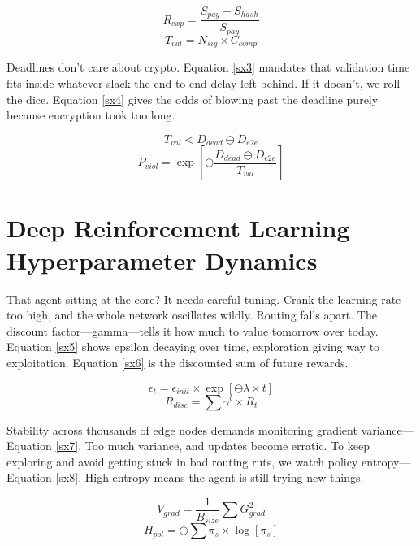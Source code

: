 \documentclass[a4paper,fleqn]{cas-dc}
\numberwithin{equation}{section}
\begin{document}
\begin{equation} R_{exp} = \frac{S_{pay} + S_{hash}}{S_{pay}} \label{sx1} \end{equation}
\begin{equation} T_{val} = N_{sig} \times C_{comp} \label{sx2} \end{equation}

Deadlines don't care about crypto. Equation \ref{sx3} mandates that validation time fits inside whatever slack the end-to-end delay left behind. If it doesn't, we roll the dice. Equation \ref{sx4} gives the odds of blowing past the deadline purely because encryption took too long.

\begin{equation} T_{val} < D_{dead} \ominus D_{e2e} \label{sx3} \end{equation}
\begin{equation} P_{viol} = \exp\left[ \ominus \frac{D_{dead} \ominus D_{e2e}}{T_{val}} \right] \label{sx4} \end{equation}

\section{Deep Reinforcement Learning Hyperparameter Dynamics}

That agent sitting at the core? It needs careful tuning. Crank the learning rate too high, and the whole network oscillates wildly. Routing falls apart. The discount factor—gamma—tells it how much to value tomorrow over today. Equation \ref{sx5} shows epsilon decaying over time, exploration giving way to exploitation. Equation \ref{sx6} is the discounted sum of future rewards.

\begin{equation} \epsilon_{t} = \epsilon_{init} \times \exp[ \ominus \lambda \times t ] \label{sx5} \end{equation}
\begin{equation} R_{disc} = \sum \gamma^{t} \times R_{t} \label{sx6} \end{equation}

Stability across thousands of edge nodes demands monitoring gradient variance—Equation \ref{sx7}. Too much variance, and updates become erratic. To keep exploring and avoid getting stuck in bad routing ruts, we watch policy entropy—Equation \ref{sx8}. High entropy means the agent is still trying new things.

\begin{equation} V_{grad} = \frac{1}{B_{size}} \sum G_{grad}^{2} \label{sx7} \end{equation}
\begin{equation} H_{pol} = \ominus \sum \pi_{s} \times \log[ \pi_{s} ] \label{sx8} \end{equation}
\end{document}
